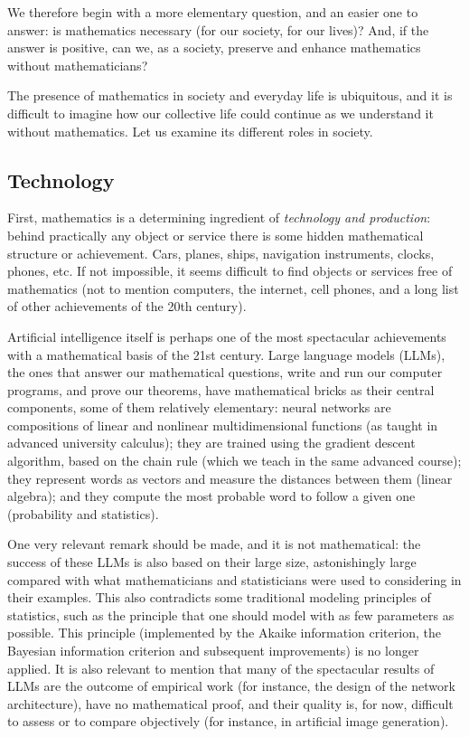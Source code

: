 \documentclass[12pt]{article}
\begin{document}
We therefore begin with a more elementary question, and an easier one to answer: is mathematics necessary (for our
society, for our lives)?
And, if the answer is positive,
can we, as a society,
preserve and enhance mathematics without mathematicians?

The presence of mathematics in society and everyday life is ubiquitous,
and it is difficult to imagine how our collective life
could continue as we understand it without mathematics.
Let us examine its different roles in society.

\subsection{Technology}

First, mathematics is a determining ingredient of \emph{technology and production}:
behind practically any object or service there is some hidden mathematical structure or achievement.
Cars, planes, ships, navigation instruments, clocks, phones, etc.
If not impossible, it seems difficult to find objects or services free of mathematics (not to mention computers, the internet, cell phones, and a long list of other achievements of the 20th century).


Artificial intelligence itself is perhaps one of the most spectacular achievements
with a mathematical basis of the 21st century.
Large language models (LLMs), the ones that answer our mathematical questions,
write and run our computer programs,
and prove our theorems,
have mathematical bricks as their central components, some of them relatively elementary:
neural networks are compositions
of linear and nonlinear multidimensional functions (as taught in advanced university calculus);
they are trained using the gradient descent algorithm, based on the chain rule (which we teach in the same advanced course);
they represent words as vectors and measure the distances between them (linear algebra);
and they compute the most probable word to follow a given one (probability and statistics).

One very relevant remark should be made, and it is not mathematical: the success of these LLMs
is also based on their large size, astonishingly large compared with what mathematicians and statisticians were used to
considering in their examples. This also contradicts some traditional modeling principles of statistics,
such as the principle that one should model with as few parameters as possible. This principle (implemented
by the Akaike information criterion, the Bayesian information criterion and subsequent improvements) is no longer applied.
It is also relevant to mention that many of the spectacular results of LLMs are the outcome of empirical work (for instance, the design of the network architecture), have no mathematical proof,
and their quality is, for now, difficult to assess or to compare objectively (for instance, in artificial image generation).
\end{document}
